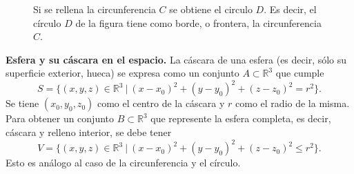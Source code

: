    \begin{figure}[H]
    \begin{center}
     \caption{Si se rellena la circunferencia $C$ se obtiene el circulo $D$. Es decir, el círculo $D$ de la figura tiene como borde, o frontera, la circunferencia $C$.}
     \end{center}
   \end{figure}
   
   
\begin{definition}\textbf{Esfera y su cáscara en el espacio.}
    La cáscara de una esfera (es decir, sólo su superficie exterior, hueca) 
    se expresa como un conjunto $A\subset\mathbb{R}^3$ que cumple
    \begin{equation*}
      S = \{  (x,y,z)  \in \mathbb{R}^3 \:|\:   (x-x_0)^2+(y-y_0)^2+(z-z_0)^2=r^2 \}.
    \end{equation*}
    Se tiene $(x_0,y_0,z_0)$ como el centro de la cáscara y $r$ como el radio de la misma.
    Para obtener un conjunto $B\subset\mathbb{R}^3$ que represente la esfera completa, es decir, cáscara y relleno interior, se debe tener
    \begin{equation*}
      V = \{  (x,y,z)  \in \mathbb{R}^3 \:|\:   (x-x_0)^2+(y-y_0)^2+(z-z_0)^2\leq r^2 \}.
    \end{equation*}
    Esto es análogo al caso de la circunferencia y el círculo.
\end{definition}

